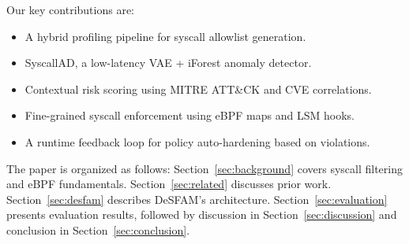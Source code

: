 Our key contributions are:
\begin{itemize}
  \item A hybrid profiling pipeline for syscall allowlist generation.
  \item SyscallAD, a low-latency VAE + iForest anomaly detector.
  \item Contextual risk scoring using MITRE ATT\&CK and CVE correlations.
  \item Fine-grained syscall enforcement using eBPF maps and LSM hooks.
  \item A runtime feedback loop for policy auto-hardening based on violations.
\end{itemize}

The paper is organized as follows: Section~\ref{sec:background} covers syscall filtering and
eBPF fundamentals. Section~\ref{sec:related} discusses prior work. Section~\ref{sec:desfam}
describes DeSFAM's architecture. Section~\ref{sec:evaluation} presents evaluation results,
followed by discussion in Section~\ref{sec:discussion} and conclusion in
Section~\ref{sec:conclusion}.
